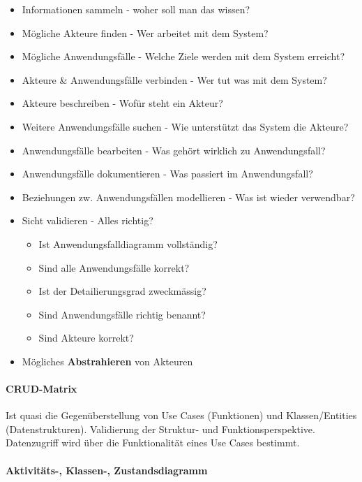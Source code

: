 \documentclass[a4paper]{article}
\begin{document}
					\begin{itemize}
						\item Informationen sammeln - woher soll man das wissen?
						\item Mögliche Akteure finden - Wer arbeitet mit dem System?
						\item Mögliche Anwendungsfälle - Welche Ziele werden mit dem System erreicht?
						\item Akteure \& Anwendungsfälle verbinden - Wer tut was mit dem System?
						\item Akteure beschreiben - Wofür steht ein Akteur?
						\item Weitere Anwendungsfälle suchen - Wie unterstützt das System die Akteure?
						\item Anwendungsfälle bearbeiten - Was gehört wirklich zu Anwendungsfall?
						\item Anwendungsfälle dokumentieren - Was passiert im Anwendungsfall?
						\item Beziehungen zw. Anwendungsfällen modellieren - Was ist wieder verwendbar?
						\item Sicht validieren - Alles richtig?
							\begin{itemize}
								\item Ist Anwendungsfalldiagramm vollständig?
								\item Sind alle Anwendungsfälle korrekt?
								\item Ist der Detailierungsgrad zweckmässig?
								\item Sind Anwendungsfälle richtig benannt?
								\item Sind Akteure korrekt?
							\end{itemize}
						\item Mögliches \textbf{Abstrahieren} von Akteuren
					\end{itemize}
		
\newpage
		
				\paragraph{CRUD-Matrix}
				
					Ist quasi die Gegenüberstellung von Use Cases (Funktionen) und Klassen/Entities (Datenstrukturen).
					Validierung der Struktur- und Funktionsperspektive.
					Datenzugriff wird über die Funktionalität eines Use Cases bestimmt.
					
				\paragraph{Aktivitäts-, Klassen-, Zustandsdiagramm}
				
\end{document}
